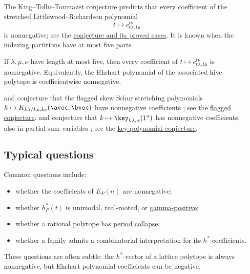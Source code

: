 The King--Tollu--Toumazet conjecture predicts that every coefficient of the
stretched Littlewood--Richardson polynomial
\[
  t\mapsto c^{t\nu}_{t\lambda,t\mu}
\]
is nonnegative; see the
\hyperref[kingTolluToumazetConjecture]{conjecture and its proved cases}.
It is known when the indexing partitions have at most five parts.

\begin{theorem}
If \(\lambda,\mu,\nu\) have length at most five, then every coefficient of
\(t\mapsto c^{t\nu}_{t\lambda,t\mu}\) is nonnegative.  Equivalently, the
Ehrhart polynomial of the associated hive polytope is coefficientwise
nonnegative.
\end{theorem}

 and  conjecture that the
flagged skew Schur stretching polynomials
$k\mapsto K_{k\lambda/k\mu,k\nu}(\avec,\bvec)$ have nonnegative
coefficients \cite{AlexanderssonOguz2023x}; see the
\hyperref[flaggedSchurKostkaConjecture]{flagged conjecture}.
 and  conjecture that
$k\mapsto\key_{k\lambda,\sigma}(1^n)$ has nonnegative coefficients, also in
partial-sum variables \cite{AlexanderssonAlhajjar2018}; see the
\hyperref[keyEhrhartConjecture]{key-polynomial conjecture}.

\subsection[ehrhartQuestions]{Typical questions}

Common questions include:
\begin{itemize}
\item whether the coefficients of \(E_P(n)\) are nonnegative;
\item whether \(h^*_P(t)\) is unimodal, real-rooted, or
\hyperref[gammaPositivePolynomial]{gamma-positive};
\item whether a rational polytope has
\hyperref[periodCollapse]{period collapse};
\item whether a family admits a combinatorial interpretation for its
\(h^*\)-coefficients.
\end{itemize}

These questions are often subtle: the \(h^*\)-vector of a lattice polytope is
always nonnegative, but Ehrhart polynomial coefficients can be negative.

